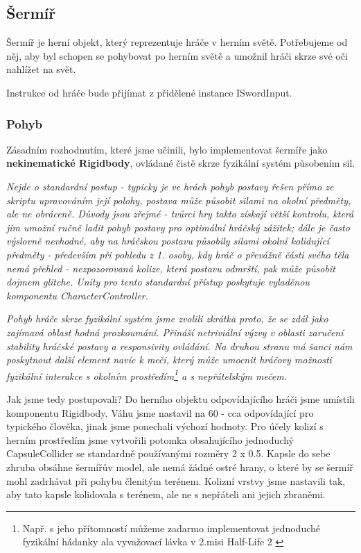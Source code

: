 \subsection{Šermíř}

Šermíř je herní objekt, který reprezentuje hráče v herním světě. Potřebujeme od něj, aby byl schopen se pohybovat po herním světě a umožnil hráči skrze své oči nahlížet na svět. 

Instrukce od hráče bude přijímat z přidělené instance ISwordInput.

\subsubsection*{Pohyb}

Zásadním rozhodnutím, které jsme učinili, bylo implementovat šermíře jako \textbf{nekinematické Rigidbody}, ovládané čistě skrze fyzikální systém působením sil. 

\textit{Nejde o standardní postup - typicky je ve hrách pohyb postavy řešen přímo ze skriptu upravováním její polohy, postava může působit silami na okolní předměty, ale ne obráceně. Důvody jsou zřejmé - tvůrci hry takto získají větší kontrolu, která jim umožní ručně ladit pohyb postavy pro optimální hráčský zážitek; dále je často výslovně nevhodné, aby na hráčskou postavu působily silami okolní kolidující předměty - především při pohledu z 1. osoby, kdy hráč o převážně části svého těla nemá přehled - nezpozorovaná kolize, která postavu odmrští, pak může působit dojmem glitche. Unity pro tento standardní přístup poskytuje vyladěnou komponentu CharacterController.}

\textit{Pohyb hráče skrze fyzikální systém jsme zvolili zkrátka proto, že se zdál jako zajímavá oblast hodná prozkoumání. Přináší netriviální výzvy v oblasti zaručení stability hráčské postavy a responsivity ovládání. Na druhou stranu má šanci nám poskytnout další element navíc k meči, který může umocnit hráčovy možnosti fyzikální interakce s okolním prostředím\footnote{Např. s jeho přítomností můžeme zadarmo implementovat jednoduché fyzikální hádanky ala vyvažovací lávka v 2.misi Half-Life 2 \cite{HalfLife2}} a s nepřátelským mečem.}

Jak jsme tedy postupovali? Do herního objektu odpovídajícího hráči jsme umístili komponentu Rigidbody. Váhu jsme nastavil na 60 - cca odpovídající pro typického člověka, jinak jsme ponechali výchozí hodnoty. Pro účely kolizí s herním prostředím jsme vytvořili potomka obsahujícího jednoduchý CapsuleCollider se standardně používanými rozměry 2 x 0.5. Kapsle do sebe zhruba obsáhne šermířův model, ale nemá žádné ostré hrany, o které by se šermíř mohl zadrhávat při pohybu členitým terénem. Kolizní vrstvy jsme nastavili tak, aby tato kapsle kolidovala s terénem, ale ne s nepřáteli ani jejich zbraněmi.

